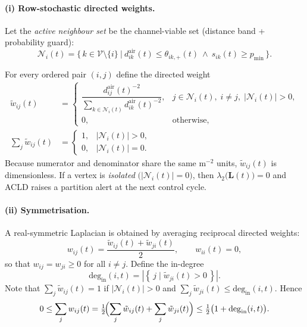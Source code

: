 \documentclass[preprint,12pt]{elsarticle}
\newcommand{\degIn}[1]{\mathrm{deg}_{\mathrm{in}}(#1,t)}
\theoremstyle{definition}\newtheorem{definition}{Definition}
\theoremstyle{plain}\newtheorem{theorem}{Theorem}
\theoremstyle{plain}\newtheorem{lemma}{Lemma}
\theoremstyle{plain}\newtheorem{corollary}{Corollary}
\theoremstyle{plain}\newtheorem{assumption}{Assumption}
\theoremstyle{remark}\newtheorem{remark}[theorem]{Remark}
\begin{document}
\paragraph{(i) Row-stochastic directed weights.}
Let the \emph{active neighbour set} be the channel-viable set (distance band + probability guard):
\[
  \mathcal N_i(t)
  = \bigl\{\,k \in \mathcal V\setminus\{i\}\ \big|\ d^{\text{air}}_{ik}(t)\le \theta_{ik,+}(t)\ \land\ s_{ik}(t)\ge p_{\min}\,\bigr\}.
\]

For every ordered pair \((i,j)\) define the directed weight
\begin{equation}
\begin{aligned}
  \tilde w_{ij}(t)&=
  \begin{cases}
    \dfrac{d^{\text{air}}_{ij}(t)^{-2}}
          {\displaystyle\sum_{k\in\mathcal N_i(t)} d^{\text{air}}_{ik}(t)^{-2}}, &
      j\in\mathcal N_i(t),\; i\neq j,\; |\mathcal N_i(t)|>0,\\[6pt]
    0, & \text{otherwise},
  \end{cases}\\[4pt]
  \sum_{j}\tilde w_{ij}(t)&=
  \begin{cases}
    1, & |\mathcal N_i(t)|>0,\\
    0, & |\mathcal N_i(t)|=0.
  \end{cases}
\end{aligned}
  \label{eq:w_tilde}
\end{equation}
Because numerator and denominator share the same \(\text{m}^{-2}\) units,
\(\tilde w_{ij}(t)\) is dimensionless.  
If a vertex is \emph{isolated} \(\bigl(|\mathcal N_i(t)|=0\bigr)\),
then \(\lambda_2\bigl(\boldsymbol L(t)\bigr)=0\) and ACLD raises a
partition alert at the next control cycle.

\paragraph{(ii) Symmetrisation.}
A real-symmetric Laplacian is obtained by averaging reciprocal
directed weights:
\begin{equation}
  w_{ij}(t)=\frac{\tilde w_{ij}(t)+\tilde w_{ji}(t)}{2},
  \qquad
  w_{ii}(t)=0,
  \label{eq:weights}
\end{equation}
so that \(w_{ij}=w_{ji}\ge 0\) for all \(i\neq j\).
Define the in-degree
\[
  \degIn{i}= \left| \left\{\, j \mid \tilde w_{ji}(t)>0\, \right\} \right|.
\]
Note that \(\sum_{j}\tilde w_{ij}(t)=1\) if \(|\mathcal N_i(t)|>0\) and
\(\sum_{j}\tilde w_{ji}(t)\le \degIn{i}\).
Hence
\[
  0\le\sum_{j} w_{ij}(t)
  =\tfrac12\!\Bigl(
      \sum_{j}\tilde w_{ij}(t)
    + \sum_{j}\tilde w_{ji}(t)
  \Bigr)
  \le \tfrac12\bigl(1+\degIn{i}\bigr).
\]
\end{document}
